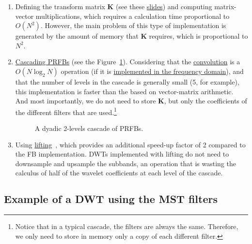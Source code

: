 \begin{enumerate}

\item Defining the transform matrix ${\mathbf K}$ (see these
  \href{https://cseweb.ucsd.edu/classes/fa17/cse166-a/lec13.pdf}{slides})
  and computing matrix-vector multiplications, which requires a
  calculation time proportional to $O(N^2)$. However, the main problem
  of this type of implementation is generated by the amount of memory
  that ${\mathbf K}$ requires, which is proportional to $N^2$.

\item
  \href{https://en.wikipedia.org/wiki/Discrete_wavelet_transform#Cascading_and_filter_banks}{Cascading
    PRFBs} (see the Figure~\ref{fig:cascade}). Considering that the
  \href{https://en.wikipedia.org/wiki/Convolution}{convolution} is a
  $O(N\log_2N)$ operation (if it is
  \href{https://en.wikipedia.org/wiki/Convolution_theorem}{implemented
    in the frequency domain}), and that the number of levels in the
  cascade is generally small (5, for example), this implementation is
  faster than the based on vector-matrix arithmetic. And most
  importantly, we do not need to store ${\mathbf K}$, but only the coefficients
  of the different filters that are used.\footnote{Notice that in a
    typical cascade, the filters are always the same. Therefore, we
    only need to store in memory only a copy of each different filter.}

\begin{figure}
  \centering
  \caption{A dyadic 2-levels cascade of PRFBs.}
  \label{fig:cascade}
\end{figure}

\item Using
  \href{https://en.wikipedia.org/wiki/Lifting_scheme}{lifting}~\cite{sweldens1997building},
  which provides an additional speed-up factor of 2 compared to the FB
  implementation. DWTs implemented with lifting do not need to
  downsample and upsample the subbands, an operation that is wasting
  the calculus of half of the wavelet coefficients at each level of
  the cascade.

\end{enumerate}


\subsection{Example of a DWT using the MST filters}

